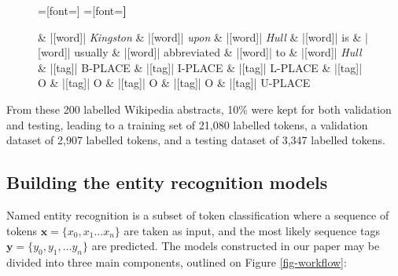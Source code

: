 \documentclass[
  letterpaper,
  11pt,
  english,
  onehalfspacing,
  headsepline]{MastersDoctoralThesis}
\begin{document}
\begin{figure}[H]
\centering
\begin{dependency}
=[font=\normalsize]
=[font=\bfseries\tiny]
\begin{deptext}[column sep=0.05cm, row sep=0.1cm]
\& |[word]| \textit{Kingston} \& |[word]| \textit{upon} \& |[word]| \textit{Hull} \& |[word]| is
\& |[word]| usually \& |[word]| abbreviated  \& |[word]| to \& |[word]| \textit{Hull} \\
\& |[tag]| B-PLACE \& |[tag]| I-PLACE \& |[tag]| L-PLACE \& |[tag]| O
\& |[tag]| O \& |[tag]| O \& |[tag]| O \& |[tag]| U-PLACE \\
\end{deptext}
\end{dependency}
\end{figure}

From these 200 labelled Wikipedia abstracts, 10\% were kept for both
validation and testing, leading to a training set of 21,080 labelled
tokens, a validation dataset of 2,907 labelled tokens, and a testing
dataset of 3,347 labelled tokens.

\hypertarget{building-the-entity-recognition-models}{%
\subsection{Building the entity recognition
models}\label{building-the-entity-recognition-models}}

Named entity recognition is a subset of token classification where a
sequence of tokens \(\mathbf{x} = \{x_{0}, x_{1}\dots x_{n}\}\) are
taken as input, and the most likely sequence tags
\(\mathbf{y} = \{y_0, y_1, \dots y_n\}\) are predicted. The models
constructed in our paper may be divided into three main components,
outlined on Figure \ref{fig-workflow}:
\end{document}
